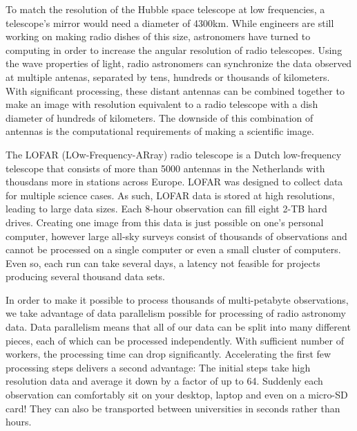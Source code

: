 To match the resolution of the Hubble space telescope at low frequencies, a telescope's mirror would need a diameter of 4300km. While engineers are still working on making radio dishes of this size, astronomers have turned to computing in order to increase the angular resolution of radio telescopes. Using the wave properties of light, radio astronomers can synchronize the data observed at multiple antenas, separated by tens, hundreds or thousands of kilometers. With significant processing, these distant antennas can be combined together to make an image with resolution equivalent to a radio telescope with a dish diameter of hundreds of kilometers. The downside of this combination of antennas is the computational requirements of making a scientific image. 

The LOFAR (LOw-Frequency-ARray) radio telescope is a Dutch low-frequency telescope that consists of more than 5000 antennas in the Netherlands with thousdans more in stations across Europe. LOFAR was designed to collect data for multiple science cases. As such, LOFAR data is stored at high resolutions, leading to large data sizes. Each 8-hour observation can fill eight 2-TB hard drives. Creating one image from this data is just possible on one's personal computer, however large all-sky surveys consist of thousands of observations and cannot be processed on a single computer or even a small cluster of computers. Even so, each run can take several days, a latency not feasible for projects producing several thousand data sets.

In order to make it possible to process thousands of multi-petabyte observations, we take advantage of data parallelism possible for processing of radio astronomy data. Data parallelism means that all of our data can be split into many different pieces, each of which can be processed independently. With sufficient number of workers, the processing time can drop significantly. Accelerating the first few processing steps delivers a second advantage: The initial steps take high resolution data and average it down by a factor of up to 64. Suddenly each observation can comfortably sit on your desktop, laptop and even on a micro-SD card! They can also be transported between universities in seconds rather than hours.


